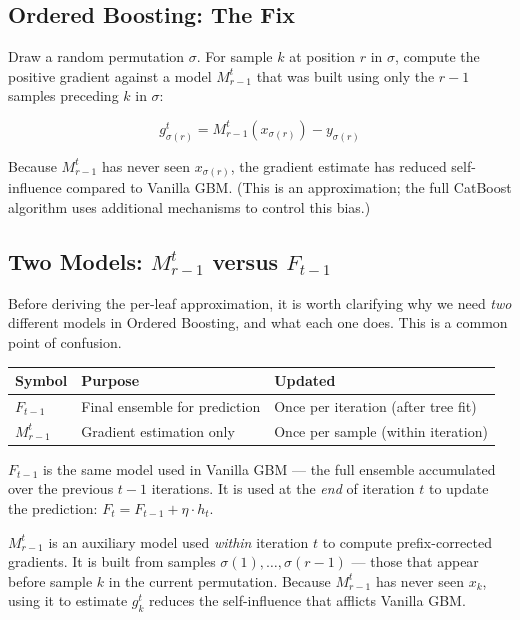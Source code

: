 \documentclass[11pt, a4paper]{article}
\begin{document}
\subsection{Ordered Boosting: The Fix}

Draw a random permutation $\sigma$. For sample $k$ at position $r$
in $\sigma$, compute the positive gradient against a model $M_{r-1}^t$ that
was built using only the $r-1$ samples preceding $k$ in $\sigma$:

\[
g_{\sigma(r)}^t = M_{r-1}^t\!\left(x_{\sigma(r)}\right) - y_{\sigma(r)}
\]

Because $M_{r-1}^t$ has never seen $x_{\sigma(r)}$, the gradient estimate
has reduced self-influence compared to Vanilla GBM.
(This is an approximation; the full CatBoost algorithm uses additional mechanisms
to control this bias.)

\subsection{Two Models: $M_{r-1}^t$ versus $F_{t-1}$}

Before deriving the per-leaf approximation, it is worth clarifying why
we need \emph{two} different models in Ordered Boosting, and what each one does.
This is a common point of confusion.

\begin{center}
\begin{tabular}{lll}
\toprule
\textbf{Symbol} & \textbf{Purpose} & \textbf{Updated} \\
\midrule
$F_{t-1}$ & Final ensemble for prediction & Once per iteration (after tree fit) \\
$M_{r-1}^t$ & Gradient estimation only & Once per sample (within iteration) \\
\bottomrule
\end{tabular}
\end{center}

$F_{t-1}$ is the same model used in Vanilla GBM --- the full ensemble
accumulated over the previous $t-1$ iterations. It is used at the
\emph{end} of iteration $t$ to update the prediction:
$F_t = F_{t-1} + \eta \cdot h_t$.

$M_{r-1}^t$ is an auxiliary model used \emph{within} iteration $t$
to compute prefix-corrected gradients. It is built from samples
$\sigma(1), \ldots, \sigma(r-1)$ --- those that appear before sample $k$
in the current permutation. Because $M_{r-1}^t$ has never seen $x_k$,
using it to estimate $g_k^t$ reduces the self-influence that afflicts
Vanilla GBM.
\end{document}
